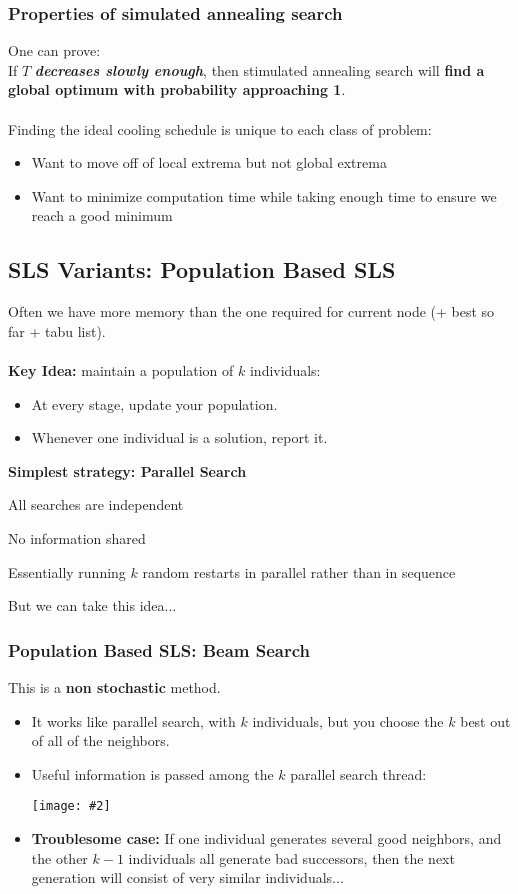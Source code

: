 \documentclass{article}
\def\red#1{{\color{red}#1}}
\newcommand{\centerfig}[2]{\begin{center}\texttt{[image: \#2]}\end{center}}
\begin{document}
\subsubsection*{Properties of simulated annealing search}
One can prove: \\
If $ T $ \textbf{\textsl{decreases slowly enough}}, then stimulated annealing search will \textbf{find a global optimum with probability approaching 1}. \\ \\
Finding the ideal cooling schedule is unique to each class of problem:
\begin{itemize}
	\item Want to move off of local extrema but not global extrema
	\item Want to minimize computation time while taking enough time to ensure we reach a good minimum
\end{itemize}

\subsection*{SLS Variants: Population Based SLS}
Often we have more memory than the one required for current node (+ best so far + tabu list). \\ \\
\textbf{Key Idea:} maintain a population of $ k $ individuals:
\begin{itemize}
	\item At every stage, update your population.
	\item Whenever one individual is a solution, report it.
\end{itemize}
\textbf{Simplest strategy: Parallel Search}
\begin{itemize}
	\item All searches are independent
	\item No information shared
	\red{\item Essentially running $ k $ random restarts in parallel rather than in sequence}
	\item But we can take this idea...
\end{itemize}

\subsubsection*{Population Based SLS: Beam Search}
This is a \textbf{non stochastic} method. \begin{itemize}[label=$ \rightarrow $]
	\item It works like parallel search, with $ k $ individuals, but you choose the $ k $ best out of all of the neighbors.
	\item Useful information is passed among the $ k $ parallel search thread:
	\centerfig{0.9}{k_para_search}
	\item \textbf{Troublesome case:} If one individual generates several good neighbors, and the other $ k-1 $ individuals all generate bad successors, \red{then the next generation will consist of very similar individuals}...
\end{itemize}
\end{document}
